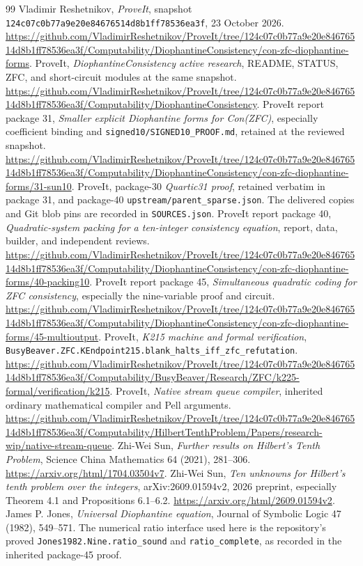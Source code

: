 \documentclass[11pt,letterpaper]{article}
\theoremstyle{definition}\newtheorem{definition}[theorem]{Definition}
\newcommand{\file}[1]{{\small\nolinkurl{#1}}}
\begin{document}
{\small
\begin{thebibliography}{99}
\setlength{\itemsep}{3pt}
\setlength{\parskip}{0pt}
 Vladimir Reshetnikov, \emph{ProveIt}, snapshot
\texttt{124c07c0b77a9e20e84676514d8b1ff78536ea3f}, 23 October 2026.
\url{https://github.com/VladimirReshetnikov/ProveIt/tree/124c07c0b77a9e20e84676514d8b1ff78536ea3f/Computability/DiophantineConsistency/con-zfc-diophantine-forms}.
 ProveIt, \emph{DiophantineConsistency active research},
README, STATUS, ZFC, and short-circuit modules at the same snapshot.
\url{https://github.com/VladimirReshetnikov/ProveIt/tree/124c07c0b77a9e20e84676514d8b1ff78536ea3f/Computability/DiophantineConsistency}.
 ProveIt report package 31, \emph{Smaller explicit
Diophantine forms for Con(ZFC)}, especially coefficient binding and
\texttt{signed10/SIGNED10\_PROOF.md}, retained at the reviewed snapshot.
\url{https://github.com/VladimirReshetnikov/ProveIt/tree/124c07c0b77a9e20e84676514d8b1ff78536ea3f/Computability/DiophantineConsistency/con-zfc-diophantine-forms/31-sun10}.
 ProveIt, package-30 \emph{Quartic31 proof}, retained
verbatim in package 31, and package-40 \texttt{upstream/parent\_sparse.json}.
The delivered copies and Git blob pins are recorded in \file{SOURCES.json}.
 ProveIt report package 40, \emph{Quadratic-system
packing for a ten-integer consistency equation}, report, data, builder,
and independent reviews.
\url{https://github.com/VladimirReshetnikov/ProveIt/tree/124c07c0b77a9e20e84676514d8b1ff78536ea3f/Computability/DiophantineConsistency/con-zfc-diophantine-forms/40-packing10}.
 ProveIt report package 45, \emph{Simultaneous quadratic
coding for ZFC consistency}, especially the nine-variable proof and circuit.
\url{https://github.com/VladimirReshetnikov/ProveIt/tree/124c07c0b77a9e20e84676514d8b1ff78536ea3f/Computability/DiophantineConsistency/con-zfc-diophantine-forms/45-multioutput}.
 ProveIt, \emph{K215 machine and formal verification},
\file{BusyBeaver.ZFC.KEndpoint215.blank_halts_iff_zfc_refutation}.
\url{https://github.com/VladimirReshetnikov/ProveIt/tree/124c07c0b77a9e20e84676514d8b1ff78536ea3f/Computability/BusyBeaver/Research/ZFC/k225-formal/verification/k215}.
 ProveIt, \emph{Native stream queue compiler}, inherited
ordinary mathematical compiler and Pell arguments.
\url{https://github.com/VladimirReshetnikov/ProveIt/tree/124c07c0b77a9e20e84676514d8b1ff78536ea3f/Computability/HilbertTenthProblem/Papers/research-wip/native-stream-queue}.
 Zhi-Wei Sun, \emph{Further results on Hilbert's Tenth
Problem}, Science China Mathematics 64 (2021), 281--306.
\url{https://arxiv.org/html/1704.03504v7}.
 Zhi-Wei Sun, \emph{Ten unknowns for Hilbert's tenth
problem over the integers}, arXiv:2609.01594v2, 2026 preprint, especially
Theorem 4.1 and Propositions 6.1--6.2.
\url{https://arxiv.org/html/2609.01594v2}.
 James P. Jones, \emph{Universal Diophantine equation},
Journal of Symbolic Logic 47 (1982), 549--571. The numerical ratio interface
used here is the repository's proved \texttt{Jones1982.Nine.ratio\_sound}
and \texttt{ratio\_complete}, as recorded in the inherited package-45 proof.
\end{thebibliography}
}
\end{document}
